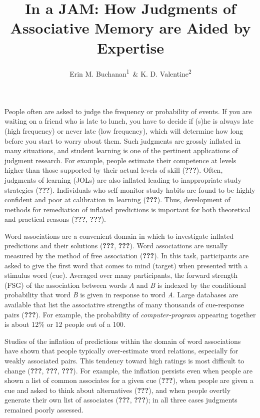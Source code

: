 \documentclass[english,man]{apa6}
\title{In a JAM: How Judgments of Associative Memory are Aided by Expertise}
\author{Erin M. Buchanan\textsuperscript{1}~\& K. D. Valentine\textsuperscript{2}}
\affiliation{
    \vspace{0.5cm}
          \textsuperscript{1} Missouri State University\\
          \textsuperscript{2} University of Missouri  }
\theoremstyle{definition}
\theoremstyle{definition}
\theoremstyle{definition}
\theoremstyle{remark}
\begin{document}
\maketitle

\setcounter{secnumdepth}{0}



People often are asked to judge the frequency or probability of events.
If you are waiting on a friend who is late to lunch, you have to decide
if (s)he is always late (high frequency) or never late (low frequency),
which will determine how long before you start to worry about them. Such
judgments are grossly inflated in many situations, and student learning
is one of the pertinent applications of judgment research. For example,
people estimate their competence at levels higher than those supported
by their actual levels of skill ({\textbf{???}}). Often, judgments of
learning (JOLs) are also inflated leading to inappropriate study
strategies ({\textbf{???}}). Individuals who self-monitor study habits
are found to be highly confident and poor at calibration in learning
({\textbf{???}}). Thus, development of methods for remediation of
inflated predictions is important for both theoretical and practical
reasons ({\textbf{???}}, {\textbf{???}}).

Word associations are a convenient domain in which to investigate
inflated predictions and their solutions ({\textbf{???}},
{\textbf{???}}). Word associations are usually measured by the method of
free association ({\textbf{???}}). In this task, participants are asked
to give the first word that comes to mind (target) when presented with a
stimulus word (cue). Averaged over many participants, the forward
strength (FSG) of the association between words \emph{A} and \emph{B} is
indexed by the conditional probability that word \emph{B} is given in
response to word \emph{A}. Large databases are available that list the
associative strengths of many thousands of cue-response pairs
({\textbf{???}}). For example, the probability of
\emph{computer-program} appearing together is about 12\% or 12 people
out of a 100.

Studies of the inflation of predictions within the domain of word
associations have shown that people typically over-estimate word
relations, especially for weakly associated pairs. This tendency toward
high ratings is most difficult to change ({\textbf{???}},
{\textbf{???}}, {\textbf{???}}). For example, the inflation persists
even when people are shown a list of common associates for a given cue
({\textbf{???}}), when people are given a cue and asked to think about
alternatives ({\textbf{???}}), and when people overtly generate their
own list of associates ({\textbf{???}}, {\textbf{???}}); in all three
cases judgments remained poorly assessed.
\end{document}

